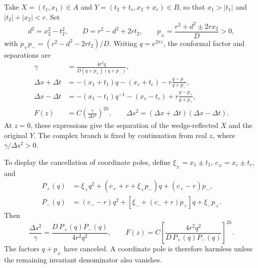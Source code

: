 \documentclass[a4paper,11pt]{article}
\theoremstyle{definition}
\begin{document}
Take $X=(t_1,x_1)\in A$ and $Y=(t_2+t_c,x_2+x_c)\in B$, so that $x_1>|t_1|$ and $|t_2|+|x_2|<r$. Set
\begin{equation}
 d^2=x_2^2-t_2^2,\qquad D=r^2-d^2+2rt_2,\qquad
 p_\pm=\frac{r^2+d^2\pm2rx_2}{D}>0,
 \label{eq:ball-parameters}
\end{equation}
with $p_+p_-=(r^2-d^2-2rt_2)/D$. Writing $q=e^{2\pi z}$, the conformal factor and separations are
\begin{align}
 \gamma&=\frac{4r^2q}{D(q+p_+)(q+p_-)},
 \label{eq:ball-gamma-factorized}\\
 \Delta x+\Delta t&=-(x_1+t_1)q-(x_c+t_c)
                       -r\frac{q-p_-}{q+p_-},
 \label{eq:ball-separation-plus}\\
 \Delta x-\Delta t&=-(x_1-t_1)q^{-1}-(x_c-t_c)
                       +r\frac{q-p_+}{q+p_+},
 \label{eq:ball-separation-minus}\\
 F(z)&=C\left(\frac{\gamma}{\Delta s^2}\right)^{2h},
 \qquad \Delta s^2=(\Delta x+\Delta t)(\Delta x-\Delta t).
 \label{eq:ball-matrix-element}
\end{align}
At $z=0$, these expressions give the separation of the wedge-reflected $X$ and the original $Y$. The complex branch is fixed by continuation from real $z$, where $\gamma/\Delta s^2>0$.

To display the cancellation of coordinate poles, define $\xi_\pm=x_1\pm t_1$, $c_\pm=x_c\pm t_c$, and
\begin{align}
 P_+(q)&=\xi_+q^2+(c_++r+\xi_+p_-)q+(c_+-r)p_-,
 \label{eq:ball-polynomial-plus}\\
 P_-(q)&=(c_--r)q^2+[\xi_-+(c_-+r)p_+]q+\xi_-p_+.
 \label{eq:ball-polynomial-minus}
\end{align}
Then
\begin{equation}
 \frac{\Delta s^2}{\gamma}
 =\frac{D\,P_+(q)P_-(q)}{4r^2q^2},\qquad
 F(z)=C\left[\frac{4r^2q^2}{D\,P_+(q)P_-(q)}\right]^{2h}.
 \label{eq:ball-invariant-denominator}
\end{equation}
The factors $q+p_\pm$ have canceled. A coordinate pole is therefore harmless unless the remaining invariant denominator also vanishes.
\end{document}
